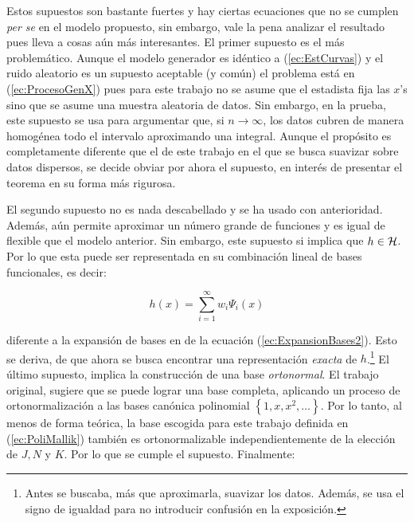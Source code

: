 \documentclass[../Main/Main.tex]{subfiles}
\begin{document}
Estos supuestos son bastante fuertes y hay ciertas ecuaciones que no se cumplen \textit{per se} en el modelo propuesto, sin embargo, vale la pena analizar el resultado pues lleva a cosas aún más interesantes. El primer supuesto es el más problemático. Aunque el modelo generador es idéntico a (\ref{ec:EstCurvas}) y el ruido aleatorio es un supuesto aceptable (y común) el problema está en (\ref{ec:ProcesoGenX}) pues para este trabajo no se asume que el estadista fija las $x$'s sino que se asume una muestra aleatoria de datos. Sin embargo, en la prueba, este supuesto se usa para argumentar que, si $n\rightarrow\infty$, los datos cubren de manera homogénea todo el intervalo aproximando una integral. Aunque el propósito es completamente diferente que el de este trabajo en el que se busca suavizar sobre datos dispersos, se decide obviar por ahora el supuesto, en interés de presentar el teorema en su forma más rigurosa.

El segundo supuesto no es nada descabellado y se ha usado con anterioridad. Además, aún permite aproximar un número  grande de funciones y es igual de flexible que el modelo anterior. Sin embargo, este supuesto si implica que $h\in\mathcal{H}$. Por lo que esta puede ser representada en su combinación lineal de bases funcionales, es decir:

$$h(x) = \sum_{i = 1}^\infty w_i \Psi_i(x)$$

diferente a la expansión de bases en de la ecuación (\ref{ec:ExpansionBases2}). Esto se deriva, de que ahora se busca encontrar una representación \textit{exacta} de $h$.\footnote{Antes se buscaba, más que aproximarla, suavizar los datos. Además, se usa el signo de igualdad para no introducir confusión en la exposición.} El último supuesto, implica la construcción de una base \textit{ortonormal}. El trabajo original, sugiere que se puede lograr una base completa, aplicando un proceso de ortonormalización a las bases canónica polinomial $\left\{1,x,x^2,\ldots\right\}$. Por lo tanto, al menos de forma teórica, la base escogida para este trabajo definida en (\ref{ec:PoliMallik}) también es ortonormalizable independientemente de la elección de $J,N$ y $K$. Por lo que se cumple el supuesto. Finalmente:
\end{document}
